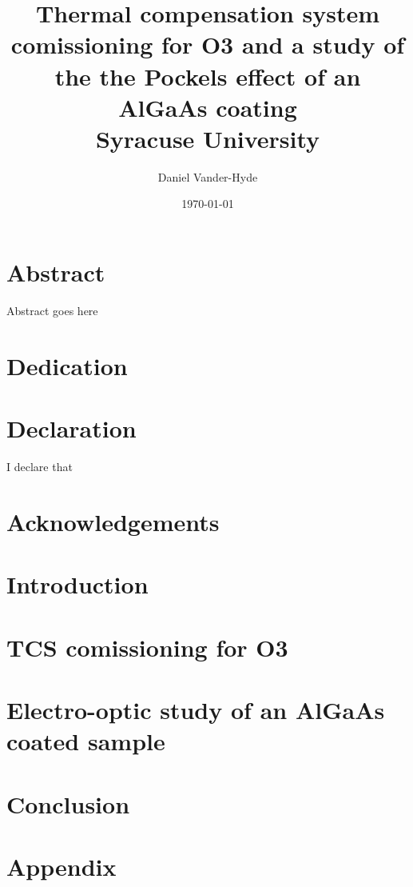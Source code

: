\documentclass[12pt]{report}
\title{
{Thermal compensation system comissioning for O3 and a study of the
the Pockels effect of an AlGaAs coating}\\
{\large Syracuse University}\\
}
\author{Daniel Vander-Hyde}
\date{\today}
\begin{document}
\maketitle

\chapter*{Abstract}
Abstract goes here

\chapter*{Dedication}

\chapter*{Declaration}
I declare that

\chapter*{Acknowledgements}


\tableofcontents

\maketitle

\newpage


\chapter{Introduction}

\newpage

\chapter{TCS comissioning for O3}


\chapter{Electro-optic study of an AlGaAs coated sample}


\chapter{Conclusion}

\chapter{Appendix}




\end{document}
